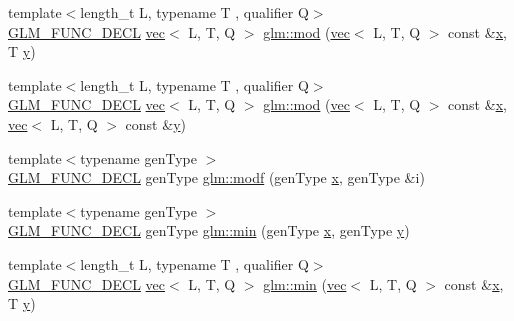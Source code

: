 \begin{DoxyCompactItemize}
\item 
{\footnotesize template$<$length\+\_\+t L, typename T , qualifier Q$>$ }\\\hyperlink{setup_8hpp_ab2d052de21a70539923e9bcbf6e83a51}{G\+L\+M\+\_\+\+F\+U\+N\+C\+\_\+\+D\+E\+CL} \hyperlink{structglm_1_1vec}{vec}$<$ L, T, Q $>$ \hyperlink{group__core__func__common_gafddfd397d57f94556b9560594172a439}{glm\+::mod} (\hyperlink{structglm_1_1vec}{vec}$<$ L, T, Q $>$ const \&\hyperlink{_s_d_l__opengl_8h_ad0e63d0edcdbd3d79554076bf309fd47}{x}, T \hyperlink{_s_d_l__opengl_8h_a1675d9d7bb68e1657ff028643b4037e3}{y})
\item 
{\footnotesize template$<$length\+\_\+t L, typename T , qualifier Q$>$ }\\\hyperlink{setup_8hpp_ab2d052de21a70539923e9bcbf6e83a51}{G\+L\+M\+\_\+\+F\+U\+N\+C\+\_\+\+D\+E\+CL} \hyperlink{structglm_1_1vec}{vec}$<$ L, T, Q $>$ \hyperlink{group__core__func__common_ga9b197a452cd52db3c5c18bac72bd7798}{glm\+::mod} (\hyperlink{structglm_1_1vec}{vec}$<$ L, T, Q $>$ const \&\hyperlink{_s_d_l__opengl_8h_ad0e63d0edcdbd3d79554076bf309fd47}{x}, \hyperlink{structglm_1_1vec}{vec}$<$ L, T, Q $>$ const \&\hyperlink{_s_d_l__opengl_8h_a1675d9d7bb68e1657ff028643b4037e3}{y})
\item 
{\footnotesize template$<$typename gen\+Type $>$ }\\\hyperlink{setup_8hpp_ab2d052de21a70539923e9bcbf6e83a51}{G\+L\+M\+\_\+\+F\+U\+N\+C\+\_\+\+D\+E\+CL} gen\+Type \hyperlink{group__core__func__common_ga85e33f139b8db1b39b590a5713b9e679}{glm\+::modf} (gen\+Type \hyperlink{_s_d_l__opengl_8h_ad0e63d0edcdbd3d79554076bf309fd47}{x}, gen\+Type \&i)
\item 
{\footnotesize template$<$typename gen\+Type $>$ }\\\hyperlink{setup_8hpp_ab2d052de21a70539923e9bcbf6e83a51}{G\+L\+M\+\_\+\+F\+U\+N\+C\+\_\+\+D\+E\+CL} gen\+Type \hyperlink{group__core__func__common_ga2c2bde1cec025b7ddff83c74a1113719}{glm\+::min} (gen\+Type \hyperlink{_s_d_l__opengl_8h_ad0e63d0edcdbd3d79554076bf309fd47}{x}, gen\+Type \hyperlink{_s_d_l__opengl_8h_a1675d9d7bb68e1657ff028643b4037e3}{y})
\item 
{\footnotesize template$<$length\+\_\+t L, typename T , qualifier Q$>$ }\\\hyperlink{setup_8hpp_ab2d052de21a70539923e9bcbf6e83a51}{G\+L\+M\+\_\+\+F\+U\+N\+C\+\_\+\+D\+E\+CL} \hyperlink{structglm_1_1vec}{vec}$<$ L, T, Q $>$ \hyperlink{group__core__func__common_ga2d274e8b537c173dba983331a2620736}{glm\+::min} (\hyperlink{structglm_1_1vec}{vec}$<$ L, T, Q $>$ const \&\hyperlink{_s_d_l__opengl_8h_ad0e63d0edcdbd3d79554076bf309fd47}{x}, T \hyperlink{_s_d_l__opengl_8h_a1675d9d7bb68e1657ff028643b4037e3}{y})

\end{DoxyCompactItemize}
